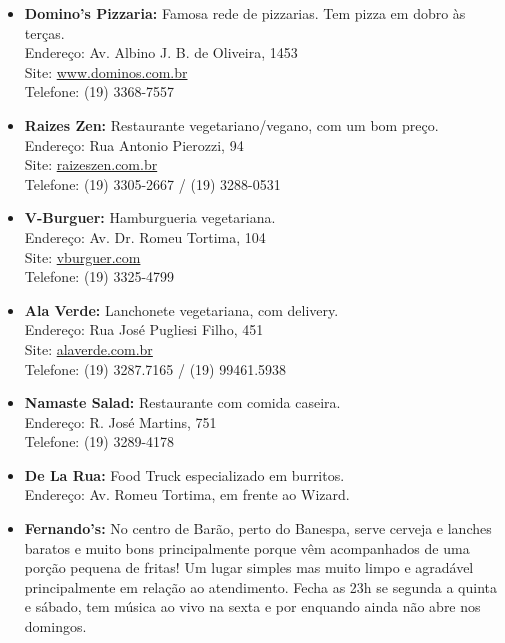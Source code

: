 \begin{itemize}
    \item   \textbf{Domino's Pizzaria:} Famosa rede de pizzarias. Tem pizza
        em dobro às terças.
        \\Endereço: Av. Albino J. B. de Oliveira, 1453
        \\Site: \url{www.dominos.com.br}
        \\Telefone: (19) 3368-7557

    \item  \textbf{Raizes Zen:} Restaurante vegetariano/vegano, com um bom
        preço.
        \\Endereço: Rua Antonio Pierozzi, 94
        \\Site: \url{raizeszen.com.br}
        \\Telefone: (19) 3305-2667 / (19) 3288-0531

    \item  \textbf{V-Burguer:} Hamburgueria vegetariana.
        \\Endereço: Av. Dr. Romeu Tortima, 104
        \\Site: \url{vburguer.com}
        \\Telefone: (19) 3325-4799

    \item  \textbf{Ala Verde:} Lanchonete vegetariana, com delivery.
        \\Endereço: Rua José Pugliesi Filho, 451
        \\Site: \url{alaverde.com.br}
        \\Telefone: (19) 3287.7165 / (19) 99461.5938

    \item  \textbf{Namaste Salad:} Restaurante com comida caseira.
        \\Endereço: R. José Martins, 751
        \\Telefone: (19) 3289-4178

    \item  \textbf{De La Rua:} Food Truck especializado em burritos.
        \\Endereço: Av. Romeu Tortima, em frente ao Wizard.

    \item  \textbf{Fernando's:} No centro de Barão, perto do Banespa, serve
        cerveja e lanches baratos e muito bons principalmente porque vêm
        acompanhados de uma porção pequena de fritas! Um lugar simples mas muito
        limpo e agradável principalmente em relação ao atendimento. Fecha as 23h
        se segunda a quinta e sábado, tem música ao vivo na sexta e por enquando
        ainda não abre nos domingos.


\end{itemize}
